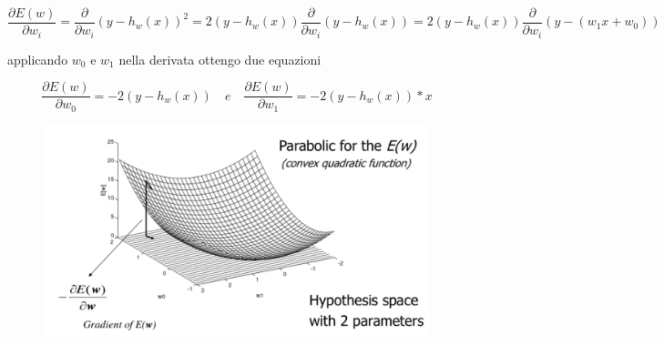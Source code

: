\documentclass{article}
\begin{document}
\begin{equation}
    \frac{\partial E(w)}{\partial w_i} = \frac{\partial}{\partial w_i} (y - h_w(x))^2 =  2(y - h_w(x)) \frac{\partial}{\partial w_i} (y - h_w(x)) = 2(y - h_w(x))\frac{\partial}{\partial w_i}(y - (w_1x+w_0))
\end{equation}

applicando $w_0$ e $w_1$ nella derivata ottengo due equazioni

\begin{equation}
    \frac{\partial E(w)}{\partial w_0} = -2(y - h_w(x)) \quad e \quad \frac{\partial E(w)}{\partial w_1} = -2(y - h_w(x)) * x
\end{equation}

\begin{figure}[H]
    \centering
    \includegraphics[scale=0.4]{Images/gradientlinearspace.png}
\end{figure}
\end{document}
